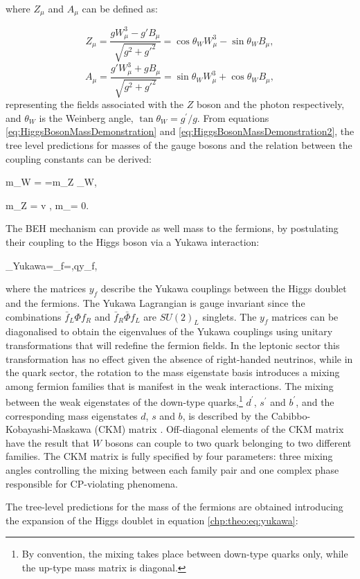 \noindent where $Z_\mu$ and $A_\mu$  can be defined as:

\begin{equation}
  Z_\mu = \frac{gW_\mu^3 - g'B_\mu}{\sqrt{g^2 + g'^2}}= \cos \theta_{W} W^{3}_{\mu}-\sin \theta_{W} B_\mu,
  \label{eq:HiggsZdefinition}
\end{equation}
\begin{equation}
  A_\mu = \frac{g'W_\mu^3 + gB_\mu}{\sqrt{g^2 + g'^2}}=\sin \theta_{W} W^{3}_{\mu}+\cos \theta_{W} B_\mu,
  \label{eq:HiggsAdefinition}
\end{equation}
\noindent representing the fields associated with the $Z$ boson and the photon respectively, and $\theta_{W}$ is the Weinberg angle, $\tan \theta_W = g^{\prime}/g$.
From equations \ref{eq:HiggsBosonMassDemonstration} and \ref{eq:HiggsBosonMassDemonstration2}, the tree level predictions for masses of the gauge bosons and the relation between the coupling constants can be derived:

\be
 m_W = =m_Z \cos \theta_{W}, 
\ee

\be
m_Z = v ,
\ee
\be
 m_\gamma = 0.
 \ee


The BEH mechanism can provide as well mass to the fermions, by postulating their coupling to the Higgs boson via a Yukawa interaction:

\be
{}_{\rm Yukawa}=\displaystyle\sum_{f=\ell,q}y_{f},
\label{chp:theo:eq:yukawa}
\ee

\noindent where the matrices $y_{f}$ describe the Yukawa couplings between the Higgs doublet and the fermions. The Yukawa Lagrangian is gauge invariant since the combinations $\bar{f}_{L}\Phi f_{R}$ and $\bar{f}_{R}\bar{\Phi} f_{L}$ are $SU(2)_{L}$ singlets. The $y_{f}$ matrices can be diagonalised to obtain the eigenvalues of the Yukawa couplings using unitary transformations that will redefine the fermion fields. In the leptonic sector this transformation has no effect given the absence of right-handed neutrinos, while in the quark sector, the rotation to the mass eigenstate basis introduces a mixing among fermion families that is manifest in the weak interactions. The mixing between the weak eigenstates of the down-type quarks,\footnote{By convention, the mixing takes place between down-type quarks only, while the up-type mass matrix is diagonal.} $d^{\prime}$, $s^{\prime}$ and $b^{\prime}$, and the corresponding mass eigenstates $d$, $s$ and $b$, is described by the Cabibbo-Kobayashi-Maskawa (CKM) matrix \cite{ckm}. Off-diagonal elements of the CKM matrix have the result that $W$ bosons can couple to two quark belonging to two different families. The CKM matrix is fully specified by four parameters: three mixing angles controlling the mixing between each family pair and one complex phase responsible for CP-violating phenomena.\par
The tree-level predictions for the mass of the fermions are obtained introducing the expansion of the Higgs doublet in equation \ref{chp:theo:eq:yukawa}:

